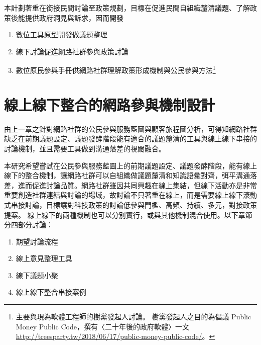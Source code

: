 \documentclass[12pt,a4paper]{article}
\begin{document}
本計劃著重在銜接民間討論至政策規劃，目標在促進民間自組織釐清議題、了解政策後能提供政府洞見與訴求，因而開發
\begin{enumerate}
\item 數位工具原型開發做議題整理
\item 線下討論促進網路社群參與政策討論
\item 數位原民參與手冊供網路社群理解政策形成機制與公民參與方法\footnote{主要與現為軟體工程師的樹黨發起人討論。 樹黨發起人之目的為倡議 Public Money Public Code，撰有〈二十年後的政府軟體〉一文 \url{http://treesparty.tw/2018/06/17/public-money-public-code/}。\label{org185f429}}
\end{enumerate}

\section{線上線下整合的網路參與機制設計 }
\label{sec:org6d00df6}

由上一章之針對網路社群的公民參與服務藍圖與顧客旅程圖分析，可得知網路社群缺乏在前期議題設定、議題發酵階段能有適合的議題釐清的工具與線上線下串接的討論機制，並且需要工具做到溝通落差的視閾融合。

本研究希望嘗試在公民參與服務藍圖上的前期議題設定、議題發酵階段，能有線上線下的整合機制，讓網路社群可以自組織做議題釐清和知識語彙對齊，弭平溝通落差，進而促進討論品質。網路社群雖因共同興趣在線上集結，但線下活動亦是非常重要創造社群連結與討論的場域，故討論不只著重在線上，而是需要線上線下滾動式串接討論，目標讓對科技政策的討論低參與門檻、高頻、持續、多元，對接政策提案。 線上線下的兩種機制也可以分別實行，或與其他機制混合使用。以下章節分四部分討論：

\begin{enumerate}
\item 期望討論流程
\item 線上意見整理工具
\item 線下議題小聚
\item 線上線下整合串接案例
\end{enumerate}
\end{document}
